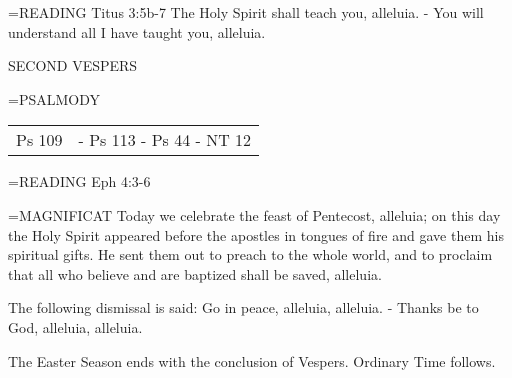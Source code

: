 \hangindent=\parindent \small{READING}	Titus 3:5b-7 \textbf{}
The Holy Spirit shall teach you, alleluia.
- You will understand all I have taught you, alleluia.

\begin{flushleft}\normalsize SECOND VESPERS\\\end{flushleft}
\hangindent=\parindent \small{PSALMODY}
\begin{center}
\begin{tabular}{ l l }
Ps 109 &  - Ps 113 - Ps 44 - NT 12\\
\end{tabular}
\end{center}		

\hangindent=\parindent \small{READING}	Eph 4:3-6 \textbf{\\}

\hangindent=\parindent \small{MAGNIFICAT 	Today we celebrate the feast of Pentecost, alleluia; on this day the Holy Spirit appeared before the apostles in tongues of fire and gave them his spiritual gifts. He sent them out to preach to the whole world, and to proclaim that all who believe and are baptized shall be saved, alleluia.\\}

The following dismissal is said:
Go in peace, alleluia, alleluia.
- Thanks be to God, alleluia, alleluia.

The Easter Season ends with the conclusion of Vespers.
Ordinary Time follows.
